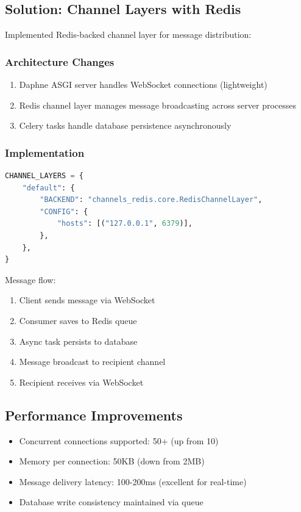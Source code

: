 \documentclass[12pt,a4paper]{report}
\begin{document}
\subsection{Solution: Channel Layers with Redis}

Implemented Redis-backed channel layer for message distribution:

\subsubsection{Architecture Changes}

\begin{enumerate}
    \item Daphne ASGI server handles WebSocket connections (lightweight)
    \item Redis channel layer manages message broadcasting across server processes
    \item Celery tasks handle database persistence asynchronously
\end{enumerate}

\subsubsection{Implementation}

\begin{lstlisting}[language=Python]
CHANNEL_LAYERS = {
    "default": {
        "BACKEND": "channels_redis.core.RedisChannelLayer",
        "CONFIG": {
            "hosts": [("127.0.0.1", 6379)],
        },
    },
}
\end{lstlisting}

Message flow:
\begin{enumerate}
    \item Client sends message via WebSocket
    \item Consumer saves to Redis queue
    \item Async task persists to database
    \item Message broadcast to recipient channel
    \item Recipient receives via WebSocket
\end{enumerate}

\subsection{Performance Improvements}

\begin{itemize}
    \item Concurrent connections supported: 50+ (up from 10)
    \item Memory per connection: 50KB (down from 2MB)
    \item Message delivery latency: 100-200ms (excellent for real-time)
    \item Database write consistency maintained via queue
\end{itemize}
\end{document}
